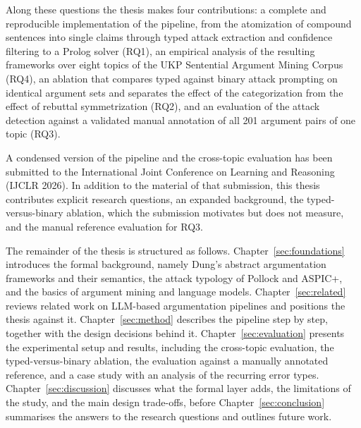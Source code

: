 Along these questions the thesis makes four contributions: a complete and
reproducible implementation of the pipeline, from the atomization of compound
sentences into single claims through typed attack extraction and confidence
filtering to a Prolog solver (RQ1), an empirical analysis of the resulting
frameworks over eight topics of the UKP Sentential Argument Mining
Corpus~\cite{stab2018} (RQ4), an ablation that compares typed against
binary attack prompting on identical argument sets and separates the effect of
the categorization from the effect of rebuttal symmetrization (RQ2), and an
evaluation of the attack detection against a validated manual
annotation of all 201 argument pairs of one topic (RQ3).

A condensed version of the pipeline and the cross-topic evaluation has been
submitted to the International Joint Conference on Learning and Reasoning
(IJCLR 2026). In addition to the material of that submission, this thesis
contributes explicit research
questions, an expanded background, the typed-versus-binary ablation, which the
submission motivates but does not measure, and the manual reference evaluation for
RQ3.

The remainder of the thesis is structured as follows.
Chapter~\ref{sec:foundations} introduces the formal background, namely Dung's
abstract argumentation frameworks and their semantics, the attack typology of
Pollock and ASPIC+, and the basics of argument mining and language models.
Chapter~\ref{sec:related} reviews related work on LLM-based argumentation
pipelines and positions the thesis against it. Chapter~\ref{sec:method}
describes the pipeline step by step, together with the design decisions behind
it. Chapter~\ref{sec:evaluation} presents the experimental setup and results,
including the cross-topic evaluation, the typed-versus-binary ablation, the
evaluation against a manually annotated reference, and a case study with an
analysis of the recurring error types. Chapter~\ref{sec:discussion} discusses what the formal layer
adds, the limitations of the study, and the main design trade-offs, before
Chapter~\ref{sec:conclusion} summarises the answers to the research questions
and outlines future work.
